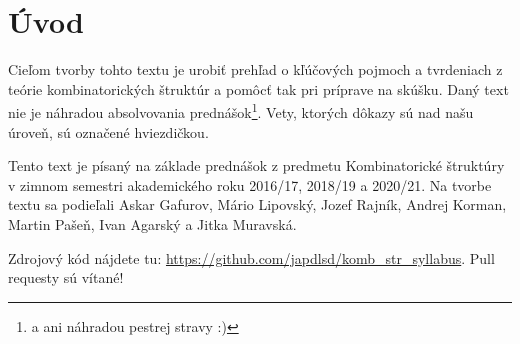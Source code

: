 \chapter*{Úvod}

Cieľom tvorby tohto textu je urobiť prehľad o kľúčových pojmoch a tvrdeniach z teórie kombinatorických štruktúr a pomôcť tak pri príprave na skúšku. 
Daný text nie je náhradou absolvovania prednášok\footnote{a ani náhradou pestrej stravy :)}.
Vety, ktorých dôkazy sú nad našu úroveň, sú označené hviezdičkou.

Tento text je písaný na základe prednášok z predmetu Kombinatorické štruktúry v zimnom semestri akademického roku 2016/17, 2018/19 a 2020/21.
Na tvorbe textu sa podieľali Askar Gafurov, Mário Lipovský, Jozef Rajník, Andrej Korman, Martin Pašeň, Ivan Agarský a Jitka Muravská.


Zdrojový kód nájdete tu: \url{https://github.com/japdlsd/komb_str_syllabus}. Pull requesty sú vítané!

